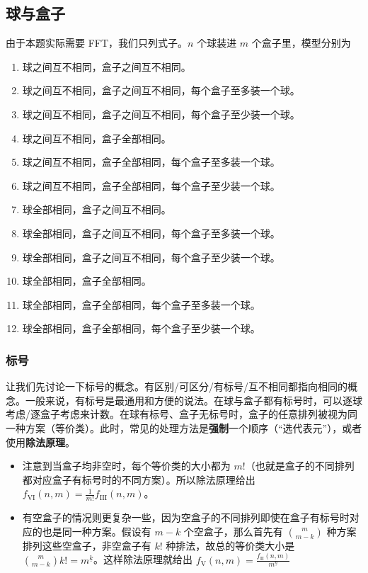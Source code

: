 \subsection{球与盒子}
    \begin{example}[洛谷 P5824 十二重计数法]
        由于本题实际需要 FFT，我们只列式子。$n$ 个球装进 $m$ 个盒子里，模型分别为
    \begin{enumerate}[label=\Roman*.]
    \item 球之间互不相同，盒子之间互不相同。
    \item 球之间互不相同，盒子之间互不相同，每个盒子至多装一个球。
    \item 球之间互不相同，盒子之间互不相同，每个盒子至少装一个球。

    \item 球之间互不相同，盒子全部相同。
    \item 球之间互不相同，盒子全部相同，每个盒子至多装一个球。
    \item 球之间互不相同，盒子全部相同，每个盒子至少装一个球。

    \item 球全部相同，盒子之间互不相同。
    \item 球全部相同，盒子之间互不相同，每个盒子至多装一个球。
    \item 球全部相同，盒子之间互不相同，每个盒子至少装一个球。

    \item 球全部相同，盒子全部相同。
    \item 球全部相同，盒子全部相同，每个盒子至多装一个球。
    \item 球全部相同，盒子全部相同，每个盒子至少装一个球。
    \end{enumerate}
    \end{example}

\subsubsection{标号}
    让我们先讨论一下标号的概念。有区别/可区分/有标号/互不相同都指向相同的概念。一般来说，有标号是最通用和方便的说法。在球与盒子都有标号时，可以逐球考虑/逐盒子考虑来计数。在球有标号、盒子无标号时，盒子的任意排列被视为同一种方案（等价类）。此时，常见的处理方法是\textbf{强制}一个顺序（“选代表元”），或者使用\textbf{除法原理}。
        \begin{itemize}
            \item 注意到当盒子均非空时，每个等价类的大小都为 $m!$（也就是盒子的不同排列都对应盒子有标号时的不同方案）。所以除法原理给出 $f_{\mathrm{VI}}(n,m)=\frac{1}{m!}f_{\mathrm{III}}(n,m)$。
            \item 有空盒子的情况则更复杂一些，因为空盒子的不同排列即使在盒子有标号时对应的也是同一种方案。假设有 $m-k$ 个空盒子，那么首先有 $\binom{m}{m-k}$ 种方案排列这些空盒子，非空盒子有 $k!$ 种排法，故总的等价类大小是 $\binom{m}{m-k} k!=m^{\underline{k}}$。这样除法原理就给出 $f_{\mathrm{V}}(n,m)=\frac{f_{\mathrm{II}}(n,m)}{m^{\underline{n}}}$
        \end{itemize}
    
